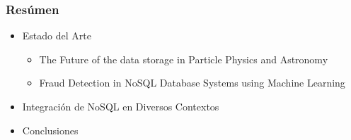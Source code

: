 \begin{frame}
    \frametitle{Resúmen}

    \begin{itemize}
        \item Estado del Arte

         
        
        \begin{itemize}
            \item The Future of the data storage in Particle Physics and Astronomy
            \item Fraud Detection in NoSQL Database Systems using Machine Learning
        \end{itemize}
        
         

        \item Integración de NoSQL en Diversos Contextos

         

        \item Conclusiones
    \end{itemize}
\end{frame}